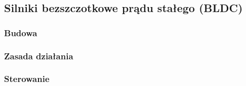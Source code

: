 \subsection{Silniki bezszczotkowe prądu stałego (BLDC)}

\subsubsection{Budowa}

\subsubsection{Zasada działania}

\subsubsection{Sterowanie}

\clearpage


